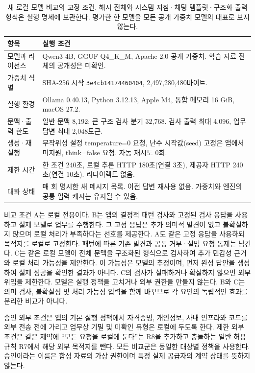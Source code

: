 \documentclass[10pt,letterpaper,twocolumn]{article}
\newcommand{\smalltable}{\small\setlength{\tabcolsep}{3pt}\renewcommand{\arraystretch}{1.13}}
\begin{document}
\begin{table}[tbp]
\centering
\caption{새 로컬 모델 비교의 고정 조건. 해시 전체와 시스템 지침·채팅 템플릿·구조화 출력 형식은 실행 명세에 보관한다. 평가한 한 모델을 모든 공개 가중치 모델의 대표로 보지 않는다.}
\label{tab:live-model-config}
\smalltable
\begin{tabular}{@{}p{.26\linewidth}p{.69\linewidth}@{}}
\toprule
항목 & 실행 조건 \\
\midrule
모델과 라이선스 & Qwen3-4B, GGUF Q4\_K\_M, Apache-2.0 공개 가중치. 학습 자료 전체의 공개성은 미확인. \\
가중치 식별 & SHA-256 시작 \texttt{3e4cb14174460404}, 2,497,280,480바이트. \\
실행 환경 & Ollama 0.40.13, Python 3.12.13, Apple M4, 통합 메모리 16 GiB, macOS 27.2. \\
문맥·출력 한도 & 일반 문맥 8,192; 큰 구조 검사 분기 32,768. 검사 출력 최대 4,096, 업무 답변 최대 2,048토큰. \\
생성·재실행 & 무작위성 설정 temperature=0 요청, 난수 시작값(seed) 고정은 앱에서 미지원, think=false 요청. 자동 재시도 0회. \\
제한 시간 & 한 조건 240초, 로컬 추론 HTTP 180초(연결 3초), 제공자 HTTP 240초(연결 10초). 리다이렉트 없음. \\
대화 상태 & 매 회 명시한 새 메시지 목록. 이전 답변 재사용 없음. 가중치와 엔진의 공통 입력 캐시는 유지될 수 있음. \\
\bottomrule
\end{tabular}
\end{table}

비교 조건 A는 로컬 전용이다. B는 앱의 결정적 패턴 검사와 고정된 검사 응답을 사용하고 실제 모델로 업무를 수행한다. 그 고정 응답은 추가 의미적 발견이 없고 불확실하지 않으며 로컬 처리가 부족하다는 선호를 제공한다. A도 같은 고정 응답을 사용하되 목적지를 로컬로 고정한다. 패턴에 따른 기존 발견과 공통 거부·설명 요청 통제는 남긴다. C는 같은 로컬 모델이 전체 문맥을 구조화된 형식으로 검사하여 추가 민감성 근거와 로컬 처리 가능성을 제안한다. 이 가능성은 모델의 추정이며, 먼저 완성 답안을 생성하여 실제 성공을 확인한 결과가 아니다. C의 검사가 실패하거나 확실하지 않으면 외부 위임을 제한한다. 모델은 실행 정책을 고치거나 외부 권한을 만들지 않는다. B와 C는 의미 검사, 불확실성 및 처리 가능성 입력을 함께 바꾸므로 각 요인의 독립적인 효과를 분리한 비교가 아니다.

승인 외부 조건은 앱의 기본 실행 정책에서 자격증명, 개인정보, 사내 인프라와 코드를 외부 전송 전에 가리고 업무상 기밀 및 미확인 유형은 로컬에 두도록 한다. 제한 외부 조건은 같은 제약에 ``모든 요청을 로컬에 둔다''는 R8을 추가하고 충돌하는 일반 허용 규칙 R7에서 해당 외부 목적지를 뺀다. 모든 비교군은 동일한 대상별 정책을 사용한다. 승인이라는 이름은 합성 자료의 가상 권한이며 특정 실제 공급자의 계약 상태를 뜻하지 않는다.
\end{document}
